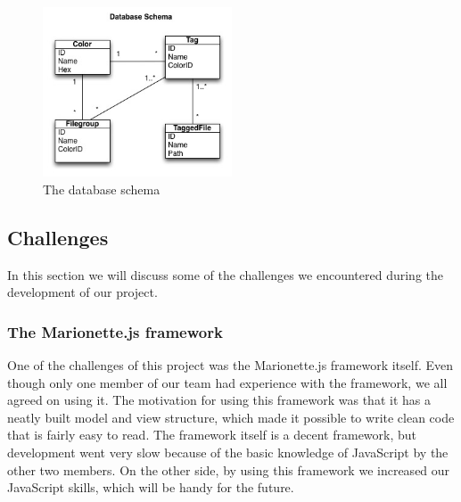 \documentclass{article}
\begin{document}
\begin{figure}[!ht]
  \centering
      \centerline{\includegraphics[width=0.5\textwidth]{Images/database.jpg}}
  \caption{The database schema}
	\label{dbmodel}
\end{figure}

\subsection{Challenges}
\label{sec:challenges}
In this section we will discuss some of the challenges we encountered during the development of our project.

\subsubsection{The Marionette.js framework}
One of the challenges of this project was the Marionette.js framework itself. Even though only one member of our team had experience with the framework, we all agreed on using it. The motivation for using this framework was that it has a neatly built model and view structure, which made it possible to write clean code that is fairly easy to read. The framework itself is a decent framework, but development went very slow because of the basic knowledge of JavaScript by the other two members. On the other side, by using this framework we increased our JavaScript skills, which will be handy for the future.
\end{document}
